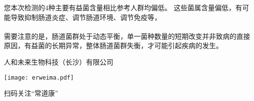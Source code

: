 \vspace*{-2.5mm}

\vspace*{3mm}
\begin{spacing}{1.5}

\vspace*{2mm}
{\indent\fontsize{9pt}{10pt}\selectfont 
您本次检测的4种主要有益菌含量相比参考人群均偏低。
这些菌属含量偏低，有可能导致抑制肠道炎症、调节肠道环境、调节免疫等，
\\\\
\indent 需要注意的是，肠道菌群处于动态平衡，单一菌种数量的短期改变并非致病的直接原因，有益菌的长期异常，整体肠道菌群失衡，才可能引起疾病的发生。}
\end{spacing}

\vspace*{5mm}

\noindent\colorbox{topcolor}{
\parbox{0.6\hsize}{
\color{white}\fontsize{9pt}{\baselineskip}\selectfont { 以上为您本次检测结果，如有任何疑问，请咨询专业医生！}
}
}

\vspace*{.5mm}

\noindent\colorbox{topcolor}{
\parbox{0.6\hsize}{
\color{white}\fontsize{9pt}{\baselineskip}\selectfont { 再次感谢您的信任和支持！}
}
}

\vspace*{3mm}

\hfill\fontsize{9pt}{11pt}\selectfont 人和未来生物科技（长沙）有限公司

\vspace*{-2mm}

\hfill\texttt{[image: erweima.pdf]}


\hfill\fontsize{9pt}{11pt}\selectfont 扫码关注“常道康”


